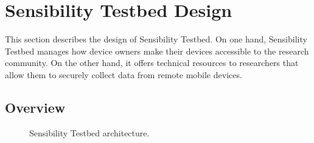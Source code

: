 \section{Sensibility Testbed Design}\label{sec-design}

This section describes the design of Sensibility Testbed. On one
hand, Sensibility Testbed manages how device owners make their
devices accessible to the research community. On the other hand,
it offers technical resources to researchers that allow them to
securely collect data from remote mobile devices.

\subsection{Overview}

\begin{figure}
\caption{\small Sensibility Testbed architecture. 
\label{fig-arch}}
\end{figure}


